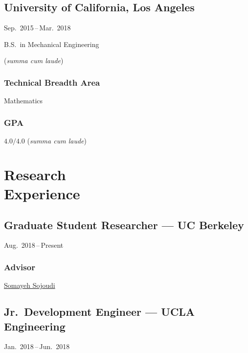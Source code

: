 \documentclass[11pt]{article}
\newcommand{\sectionwidth}{1in}		%
\newcommand{\subsectionskip}{\baselineskip}	%
\newcommand{\cvdates}[2]{\hfill#1\,--\,#2}	%
\begin{document}
	\subsection{University of California, Los Angeles}
	\cvdates{Sep.\ 2015}{Mar.\ 2018}
	
	\hspace*{\sectionwidth}B.S.\ in Mechanical Engineering
	\begin{gpa-off}
		(\textit{summa cum laude})
	\end{gpa-off}
	
	\subsubsection{Technical Breadth Area}
	Mathematics
	
	\begin{gpa-on}
		\subsubsection{GPA}
		$4.0/4.0$ (\textit{summa cum laude})
	\end{gpa-on}
	
	\section{\texorpdfstring{Research \\[\baselineskip] Experience}{Research Experience}}
	\hfill\vspace*{-2\baselineskip}

	\subsection{Graduate Student Researcher --- UC Berkeley}
	\cvdates{Aug.\ 2018}{Present}
	
	\subsubsection{Advisor}
	\href{https://people.eecs.berkeley.edu/~sojoudi/}{Somayeh Sojoudi}
	
	\vspace*{\subsectionskip}
	
	\subsection{Jr.\ Development Engineer --- UCLA Engineering}
	\cvdates{Jan.\ 2018}{Jun.\ 2018}
	
\end{document}
